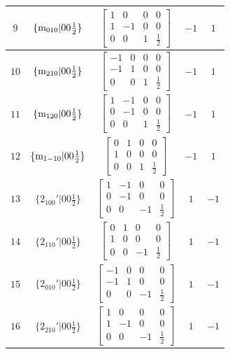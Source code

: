 \documentclass[fleqn,8pt]{jsarticle}
\begin{document}
\begin{longtable}{ccccc}
$ 9 $ & $ \{{\rm m}_{010}|0 0 \frac{1}{2}\} $ & $ \begin{bmatrix} 1 & 0 & 0 & 0 \\ 1 & -1 & 0 & 0 \\ 0 & 0 & 1 & \frac{1}{2} \end{bmatrix} $ & $ -1 $ & $ 1 $ \\ \hline
$ 10 $ & $ \{{\rm m}_{210}|0 0 \frac{1}{2}\} $ & $ \begin{bmatrix} -1 & 0 & 0 & 0 \\ -1 & 1 & 0 & 0 \\ 0 & 0 & 1 & \frac{1}{2} \end{bmatrix} $ & $ -1 $ & $ 1 $ \\ \hline
$ 11 $ & $ \{{\rm m}_{120}|0 0 \frac{1}{2}\} $ & $ \begin{bmatrix} 1 & -1 & 0 & 0 \\ 0 & -1 & 0 & 0 \\ 0 & 0 & 1 & \frac{1}{2} \end{bmatrix} $ & $ -1 $ & $ 1 $ \\ \hline
$ 12 $ & $ \{{\rm m}_{1-10}|0 0 \frac{1}{2}\} $ & $ \begin{bmatrix} 0 & 1 & 0 & 0 \\ 1 & 0 & 0 & 0 \\ 0 & 0 & 1 & \frac{1}{2} \end{bmatrix} $ & $ -1 $ & $ 1 $ \\ \hline
$ 13 $ & $ \{2{}_{100}{}'|0 0 \frac{1}{2}\} $ & $ \begin{bmatrix} 1 & -1 & 0 & 0 \\ 0 & -1 & 0 & 0 \\ 0 & 0 & -1 & \frac{1}{2} \end{bmatrix} $ & $ 1 $ & $ -1 $ \\ \hline
$ 14 $ & $ \{2{}_{110}{}'|0 0 \frac{1}{2}\} $ & $ \begin{bmatrix} 0 & 1 & 0 & 0 \\ 1 & 0 & 0 & 0 \\ 0 & 0 & -1 & \frac{1}{2} \end{bmatrix} $ & $ 1 $ & $ -1 $ \\ \hline
$ 15 $ & $ \{2{}_{010}{}'|0 0 \frac{1}{2}\} $ & $ \begin{bmatrix} -1 & 0 & 0 & 0 \\ -1 & 1 & 0 & 0 \\ 0 & 0 & -1 & \frac{1}{2} \end{bmatrix} $ & $ 1 $ & $ -1 $ \\ \hline
$ 16 $ & $ \{2{}_{210}{}'|0 0 \frac{1}{2}\} $ & $ \begin{bmatrix} 1 & 0 & 0 & 0 \\ 1 & -1 & 0 & 0 \\ 0 & 0 & -1 & \frac{1}{2} \end{bmatrix} $ & $ 1 $ & $ -1 $ \\ \hline

\end{longtable}
\end{document}

